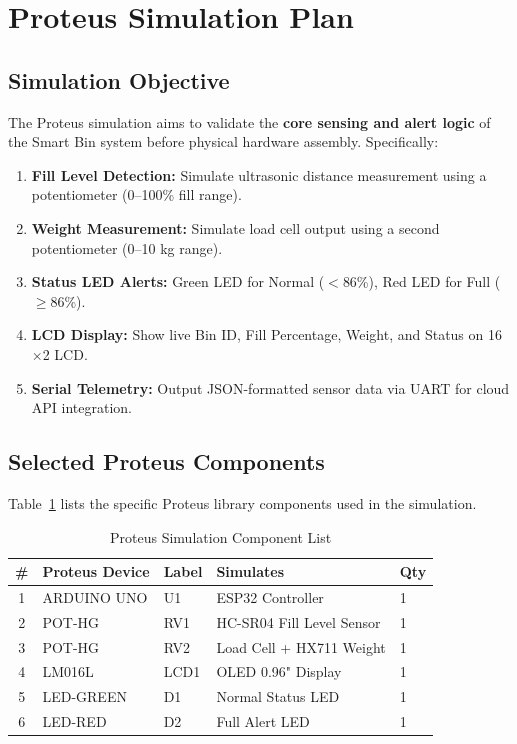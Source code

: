 \documentclass[12pt,a4paper]{article}
\begin{document}
\section{Proteus Simulation Plan}

\subsection{Simulation Objective}

The Proteus simulation aims to validate the \textbf{core sensing and alert logic} of the Smart Bin system before physical hardware assembly. Specifically:

\begin{enumerate}[leftmargin=*]
    \item \textbf{Fill Level Detection:} Simulate ultrasonic distance measurement using a potentiometer (0--100\% fill range).
    \item \textbf{Weight Measurement:} Simulate load cell output using a second potentiometer (0--10 kg range).
    \item \textbf{Status LED Alerts:} Green LED for Normal ($<$86\%), Red LED for Full ($\geq$86\%).
    \item \textbf{LCD Display:} Show live Bin ID, Fill Percentage, Weight, and Status on 16$\times$2 LCD.
    \item \textbf{Serial Telemetry:} Output JSON-formatted sensor data via UART for cloud API integration.
\end{enumerate}

\subsection{Selected Proteus Components}

Table~\ref{tab:proteus_components} lists the specific Proteus library components used in the simulation.

\begin{table}[H]
\centering
\caption{Proteus Simulation Component List}
\label{tab:proteus_components}
\begin{tabular}{@{}cllll@{}}
\toprule
\textbf{\#} & \textbf{Proteus Device} & \textbf{Label} & \textbf{Simulates} & \textbf{Qty} \\
\midrule
1 & ARDUINO UNO   & U1  & ESP32 Controller          & 1 \\
2 & POT-HG        & RV1 & HC-SR04 Fill Level Sensor  & 1 \\
3 & POT-HG        & RV2 & Load Cell + HX711 Weight   & 1 \\
4 & LM016L        & LCD1& OLED 0.96" Display         & 1 \\
5 & LED-GREEN     & D1  & Normal Status LED          & 1 \\
6 & LED-RED       & D2  & Full Alert LED             & 1 \\
\bottomrule
\end{tabular}
\end{table}
\end{document}
